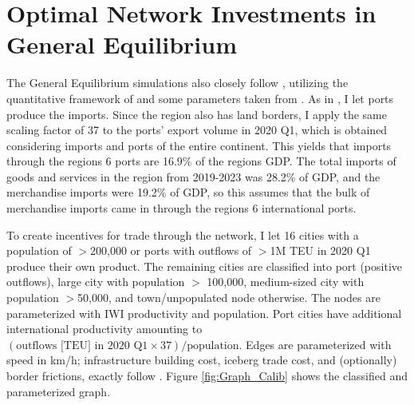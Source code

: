 \documentclass[a4paper]{article}
\begin{document}


 \newpage


\section{Optimal Network Investments in General Equilibrium}

The General Equilibrium simulations also closely follow \citet{krantz2024optimal}, utilizing the quantitative framework of \citet{fajgelbaum2020optimal} and some parameters taken from \citet{graff2024spatial}. As in \citet{krantz2024optimal}, I let ports produce the imports. Since the region also has land borders, I apply the same scaling factor of 37 to the ports' export volume in 2020 Q1, which is obtained considering imports and ports of the entire continent. This yields that imports through the regions 6 ports are 16.9\% of the regions GDP. The total imports of goods and services in the region from 2019-2023 was 28.2\% of GDP, and the merchandise imports were 19.2\% of GDP, so this assumes that the bulk of merchandise imports came in through the regions 6 international ports.  \newline 

To create incentives for trade through the network, I let 16 cities with a population of $>$200,000 or ports with outflows of $>$1M TEU in 2020 Q1 produce their own product. The remaining cities are classified into port (positive outflows), large city with population $>$ 100,000, medium-sized city with population $>$50,000, and town/unpopulated node otherwise. The nodes are parameterized with IWI productivity and population. Port cities have additional international productivity amounting to $(\text{outflows [TEU] in 2020 Q1}\times 37)/\text{population}$. Edges are parameterized with speed in km/h; infrastructure building cost, iceberg trade cost, and (optionally) border frictions, exactly follow \citet{krantz2024optimal}. Figure \ref{fig:Graph_Calib} shows the classified and parameterized graph. %
\end{document}
